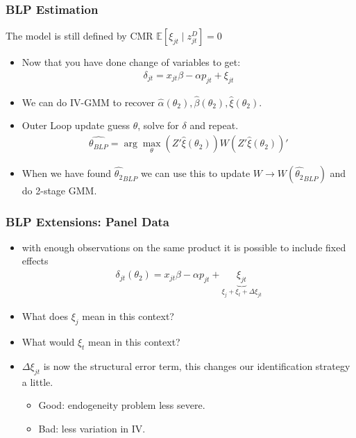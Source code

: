 \documentclass[aspectratio=169,10pt]{beamer}
\begin{document}
 \begin{frame}
\frametitle{BLP Estimation}
The model is still defined by CMR $\mathbb{E}[\xi_{jt} \mid  z_{jt}^D]=0$
\begin{itemize}
 \item Now that you have done change of variables to get:
 \begin{align*}
\delta_{jt}= x_{jt} \beta -\alpha p_{jt}+  \xi_{jt}
 \end{align*}
 \item We can do IV-GMM to recover $\hat{\alpha}(\theta_2),\widehat{\beta}(\theta_2),\widehat{\xi}(\theta_2)$.
 \item Outer Loop update guess $\theta$, solve for $\delta$ and repeat.
 \begin{align*}
 \widehat{\theta_{BLP}} = \arg \max_{\theta} (Z' \widehat{\xi}(\theta_2)) W  (Z' \widehat{\xi}(\theta_2))'
 \end{align*}
 \item When we have found $\widehat{\theta_2}_{BLP}$ we can use this to update $W \rightarrow W(\widehat{\theta_2}_{BLP})$ and do 2-stage GMM.
 \end{itemize}
\end{frame}



\begin{frame}
\frametitle{BLP Extensions: Panel Data}
\begin{itemize}
\item with enough observations on the same product it is possible to include fixed effects
\begin{align*}
\delta_{jt}(\theta_2) = x_{jt} \beta - \alpha p_{jt} + \underbrace{\xi_{jt}}_{\xi_{j} + \xi_t + \Delta \xi_{jt}}
\end{align*}
\item What does $\xi_{j}$ mean in this context?
\item What would $\xi_t$ mean in this context?
\item $\Delta \xi_{jt}$ is now the structural error term, this changes our identification strategy a little. 
\begin{itemize}
\item Good: endogeneity problem less severe.
\item Bad: less variation in IV.
\end{itemize}
\end{itemize}
\end{frame}
\end{document}
